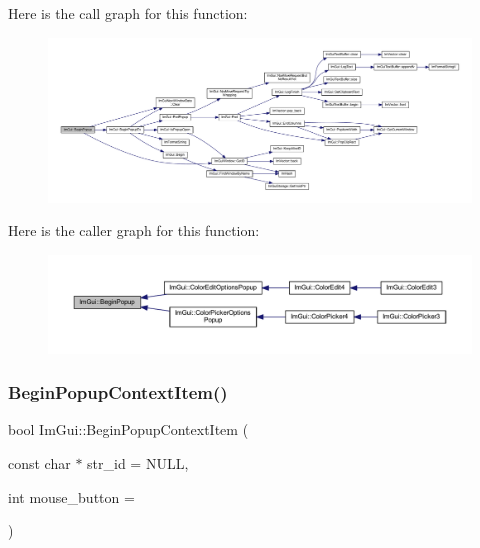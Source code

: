 Here is the call graph for this function\+:
\nopagebreak
\begin{figure}[H]
\begin{center}
\leavevmode
\includegraphics[width=350pt]{namespace_im_gui_a10e213926d8ca212266bc5fbded1e026_cgraph}
\end{center}
\end{figure}
Here is the caller graph for this function\+:
\nopagebreak
\begin{figure}[H]
\begin{center}
\leavevmode
\includegraphics[width=350pt]{namespace_im_gui_a10e213926d8ca212266bc5fbded1e026_icgraph}
\end{center}
\end{figure}
\mbox{\label{namespace_im_gui_a579fc507f5b5d164c8fd628aee3d7bbd}} 
\subsubsection{\texorpdfstring{Begin\+Popup\+Context\+Item()}{BeginPopupContextItem()}}
{\footnotesize\ttfamily bool Im\+Gui\+::\+Begin\+Popup\+Context\+Item (\begin{DoxyParamCaption}\item[{const char $\ast$}]{str\+\_\+id = {\ttfamily NULL},  }\item[{int}]{mouse\+\_\+button = {} }\end{DoxyParamCaption})}


